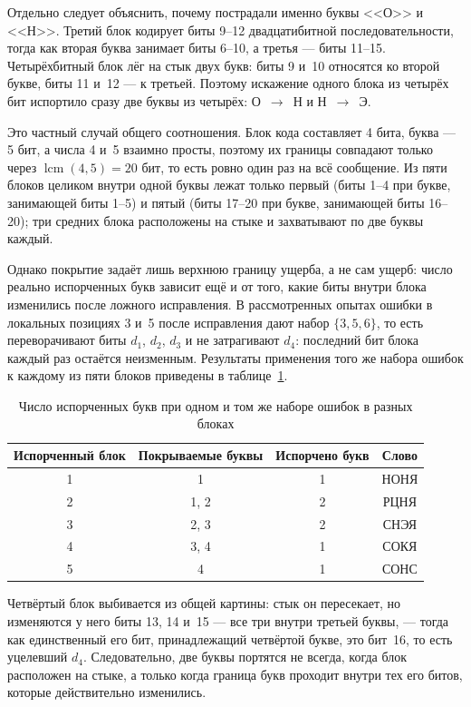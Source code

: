 \documentclass[a4paper,14pt]{extarticle}
\begin{document}
Отдельно следует объяснить, почему пострадали именно буквы <<О>> и <<Н>>. Третий блок
кодирует биты 9--12 двадцатибитной последовательности, тогда как вторая буква занимает
биты 6--10, а третья --- биты 11--15. Четырёхбитный блок лёг на стык двух букв: биты 9
и~10 относятся ко второй букве, биты 11 и~12 --- к третьей. Поэтому искажение одного
блока из четырёх бит испортило сразу две буквы из четырёх: О~$\to$~Н и Н~$\to$~Э.

Это частный случай общего соотношения. Блок кода составляет 4 бита, буква --- 5 бит,
а числа 4 и~5 взаимно просты, поэтому их границы совпадают только через
$\operatorname{lcm}(4,5) = 20$ бит, то есть ровно один раз на всё сообщение. Из пяти
блоков целиком внутри одной буквы лежат только первый (биты 1--4 при букве, занимающей
биты 1--5) и пятый (биты 17--20 при букве, занимающей биты 16--20); три средних блока
расположены на стыке и захватывают по две буквы каждый.

Однако покрытие задаёт лишь верхнюю границу ущерба, а не сам ущерб: число реально
испорченных букв зависит ещё и от того, какие биты внутри блока изменились после
ложного исправления. В рассмотренных опытах ошибки в локальных позициях 3 и~5 после
исправления дают набор $\{3, 5, 6\}$, то есть переворачивают биты $d_1$, $d_2$, $d_3$
и не затрагивают $d_4$: последний бит блока каждый раз остаётся неизменным. Результаты
применения того же набора ошибок к каждому из пяти блоков приведены
в таблице~\ref{tab:letters}.

\begin{table}[H]
\caption{Число испорченных букв при одном и том же наборе ошибок в разных блоках}
\label{tab:letters}
\centering\footnotesize\setlength{\tabcolsep}{8pt}
\begin{tabular}{c|c|c|c}
\toprule
Испорченный блок & Покрываемые буквы & Испорчено букв & Слово \\
\midrule
1 & 1 & 1 & НОНЯ \\
2 & 1, 2 & 2 & РЦНЯ \\
3 & 2, 3 & 2 & СНЭЯ \\
4 & 3, 4 & 1 & СОКЯ \\
5 & 4 & 1 & СОНС \\
\bottomrule
\end{tabular}
\end{table}

Четвёртый блок выбивается из общей картины: стык он пересекает, но изменяются у него
биты 13, 14 и~15 --- все три внутри третьей буквы, --- тогда как единственный его бит,
принадлежащий четвёртой букве, это бит~16, то есть уцелевший $d_4$. Следовательно, две
буквы портятся не всегда, когда блок расположен на стыке, а только когда граница букв
проходит внутри тех его битов, которые действительно изменились.
\end{document}
